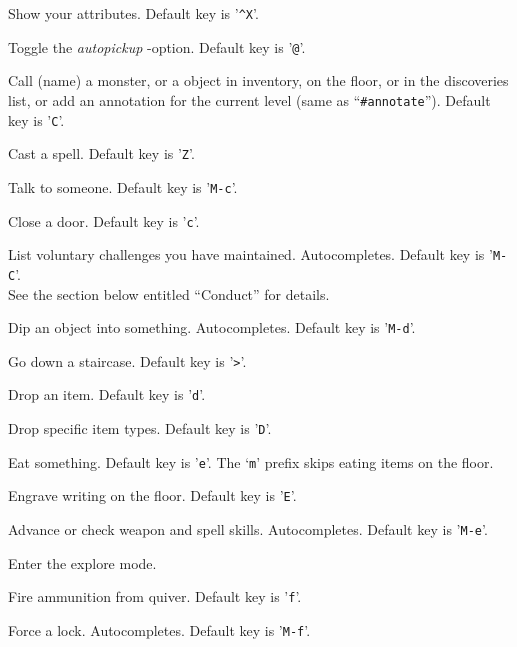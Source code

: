 \item[\tb{\#attributes}]
Show your attributes. Default key is '{\tt \^{}X}'.\\
\item[\tb{\#autopickup}]
Toggle the {\it autopickup\/} -option. Default key is '{\tt @}'.\\
\item[\tb{\#call}]
Call (name) a monster, or a object in inventory, on the floor,
or in the discoveries list, or add an annotation for the
current level (same as ``{\tt \#annotate}''). Default key is '{\tt C}'.
\item[\tb{\#cast}]
Cast a spell. Default key is '{\tt Z}'.\\
\item[\tb{\#chat}]
Talk to someone. Default key is '{\tt M-c}'.\\
\item[\tb{\#close}]
Close a door. Default key is '{\tt c}'.\\
\item[\tb{\#conduct}]
List voluntary challenges you have maintained. Autocompletes.
Default key is '{\tt M-C}'.\\
See the section below entitled ``Conduct'' for details.
\item[\tb{\#dip}]
Dip an object into something. Autocompletes. Default key is '{\tt M-d}'.
\item[\tb{\#down}]
Go down a staircase. Default key is '{\tt >}'.
\item[\tb{\#drop}]
Drop an item. Default key is '{\tt d}'.
\item[\tb{\#droptype}]
Drop specific item types. Default key is '{\tt D}'.
\item[\tb{\#eat}]
Eat something. Default key is '{\tt e}'.
The `{\tt m}' prefix skips eating items on the floor.
\item[\tb{\#engrave}]
Engrave writing on the floor. Default key is '{\tt E}'.
\item[\tb{\#enhance}]
Advance or check weapon and spell skills. Autocompletes.
Default key is '{\tt M-e}'.
\item[\tb{\#exploremode}]
Enter the explore mode.
\item[\tb{\#fire}]
Fire ammunition from quiver. Default key is '{\tt f}'.
\item[\tb{\#force}]
Force a lock. Autocompletes. Default key is '{\tt M-f}'.
\item[\tb{\#glance}]
